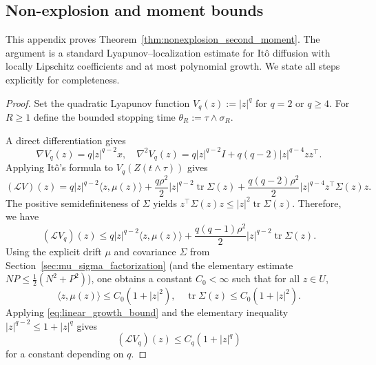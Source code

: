 \documentclass[pdflatex,sn-mathphys-ay]{sn-jnl}
\theoremstyle{thmstyleone}
\theoremstyle{definition}
\theoremstyle{remark}
\begin{document}
\begin{appendices}

\section{Non-explosion and moment bounds}\label{app:higher_moments}

This appendix proves Theorem~\ref{thm:nonexplosion_second_moment}.  The argument is a standard Lyapunov--localization
estimate for It\^o diffusion with locally Lipschitz coefficients and at most polynomial growth.  We state all steps
explicitly for completeness.

\begin{proof}
Set the quadratic Lyapunov function $V_q(z):=|z|^q$ for $q=2$ or $q\ge 4$.
For $R\ge 1$ define the bounded stopping time $\theta_R:=\tau\wedge\sigma_R$.

A direct differentiation gives
\begin{equation*}
    \nabla V_q(z) = q \lvert z\rvert^{q-2}x,\quad \nabla^2V_q(z) = q\lvert z\rvert^{q-2}I + q(q-2)\lvert z\rvert^{q-4}zz^\top.
\end{equation*}
Applying It\^o's formula to $V_q(Z(t\wedge \tau))$ gives
\begin{equation*}
    (\mathcal{L}V)(z) = q \lvert z\rvert^{q-2}\langle z,\mu(z)\rangle + \frac{q\rho^2}{2}\lvert z\rvert^{q-2}\operatorname{tr} \Sigma(z) + \frac{q(q-2)\rho^2}{2}\lvert z\rvert^{q-4}z^\top \Sigma(z)z.
\end{equation*}
The positive semidefiniteness of $\Sigma$ yields $z^\top \Sigma(z)z \le \lvert z\rvert^2 \operatorname{tr}\Sigma(z)$. 
Therefore, we have
\begin{equation*}
(\mathcal{L}V_q)(z) \le q\lvert z\rvert^{q-2}\langle z,\mu(z)\rangle + \frac{q(q-1)\rho^2}{2}\lvert z\rvert^{q-2}\operatorname{tr}\Sigma(z).
\end{equation*}
Using the explicit drift $\mu$ and covariance $\Sigma$ from Section~\ref{sec:mu_sigma_factorization}
(and the elementary estimate $NP\le \frac12(N^2+P^2)$), one obtains a constant $C_0<\infty$ such that for all $z\in U$,
\begin{equation}\label{eq:linear_growth_bound}
    \langle z, \mu(z)\rangle \le C_0 (1+\lvert z\rvert^2),\quad \operatorname{tr}\Sigma(z) \le C_0(1+\lvert z\rvert^2).
\end{equation}
Applying \eqref{eq:linear_growth_bound} and the elementary inequality $\lvert z\rvert^{q-2}\le 1+\lvert z\rvert^q$ gives
\begin{equation}\label{eq:LV_bound}
(\mathcal{L}V_q)(z) \le C_q(1+\lvert z\rvert^q)
\end{equation}
for a constant depending on $q$.


\end{proof}
\end{appendices}
\end{document}
